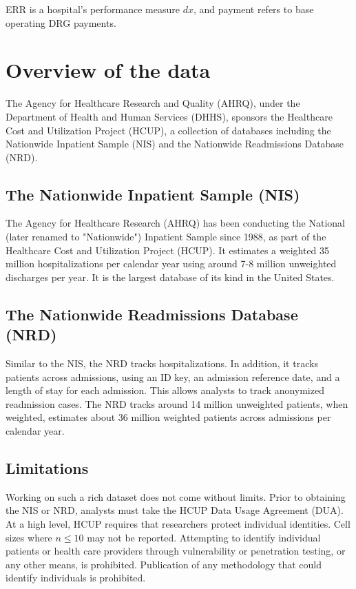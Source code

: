 ERR is a hospital's performance measure $dx$, and payment refers to base operating DRG payments. \cite{HRRPPaymentAdjustment, Lessa2015}


\section{Overview of the data}

The Agency for Healthcare Research and Quality (AHRQ), under the Department of Health and Human Services (DHHS), sponsors the
Healthcare Cost and Utilization Project (HCUP), a collection of databases including the Nationwide Inpatient Sample (NIS) and
the Nationwide Readmissions Database (NRD). \cite{HCUPOverview}

\subsection{The Nationwide Inpatient Sample (NIS)}

The Agency for Healthcare Research (AHRQ) has been conducting the National (later renamed to "Nationwide") Inpatient
Sample since 1988, as part of the Healthcare Cost and Utilization Project (HCUP). It estimates a weighted 35 million
hospitalizations per calendar year using around 7-8 million unweighted discharges per year. It is the largest database
of its kind in the United States. \cite{NISOverview}

\subsection{The Nationwide Readmissions Database (NRD)}

Similar to the NIS, the NRD tracks hospitalizations. In addition, it tracks patients across admissions, using an ID key,
an admission reference date, and a length of stay for each admission. This allows analysts to track anonymized readmission cases.
The NRD tracks around 14 million unweighted patients, when weighted, estimates about 36 million weighted patients across admissions 
per calendar year. \cite{NRDOverview} 

\subsection{Limitations}

Working on such a rich dataset does not come without limits. Prior to obtaining the NIS or NRD, analysts must take the HCUP
Data Usage Agreement (DUA). At a high level, HCUP requires that researchers protect individual identities. Cell sizes where $n \le 10$ 
may not be reported. Attempting to identify individual patients or health care providers through vulnerability or penetration testing, 
or any other means, is prohibited. Publication of any methodology that could identify individuals is prohibited.


